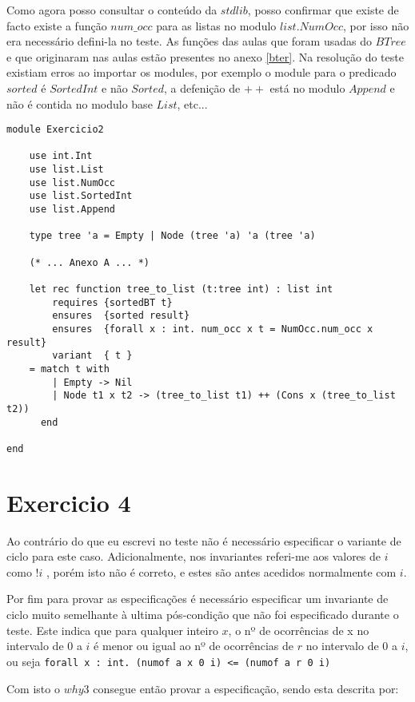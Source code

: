 \documentclass[12pt]{article}
\begin{document}
Como agora posso consultar o conteúdo da $stdlib$, posso confirmar que existe de facto existe a função $num\_occ$ para as listas no modulo $list.NumOcc$, por isso não era necessário defini-la no teste. As funções das aulas que foram usadas do $BTree$ e que originaram nas aulas estão presentes no anexo \ref{bter}. Na resolução do teste existiam erros ao importar os modules, por exemplo o module para o predicado $sorted$ é $SortedInt$ e não $Sorted$, a defenição de $++$ está no modulo $Append$ e não é contida no modulo base $List$, etc... 
\begin{verbatim}
module Exercicio2

    use int.Int
    use list.List
    use list.NumOcc
    use list.SortedInt
    use list.Append

    type tree 'a = Empty | Node (tree 'a) 'a (tree 'a)
    
    (* ... Anexo A ... *)
    
    let rec function tree_to_list (t:tree int) : list int
        requires {sortedBT t}
        ensures  {sorted result}
        ensures  {forall x : int. num_occ x t = NumOcc.num_occ x result}
        variant  { t }
    = match t with
        | Empty -> Nil
        | Node t1 x t2 -> (tree_to_list t1) ++ (Cons x (tree_to_list t2))
      end

end
\end{verbatim}

\section*{Exercicio 4}

Ao contrário do que eu escrevi no teste não é necessário especificar o variante de ciclo para este caso.
Adicionalmente, nos invariantes referi-me aos valores de $i$ como $!i$ , porém isto não é correto, e estes são antes acedidos normalmente com $i$.

Por fim para provar as especificações é necessário especificar um invariante de ciclo muito semelhante à ultima pós-condição que não foi especificado durante o teste. Este indica que para qualquer inteiro $x$, o nº de ocorrências de x no intervalo de $0$ a $i$ é menor ou igual ao nº de ocorrências de $r$ no intervalo de $0$ a $i$, ou seja \texttt{forall x : int. (numof a x 0 i)  <= (numof a r 0 i)}

Com isto o $why3$ consegue então provar a especificação, sendo esta descrita por:
\end{document}
